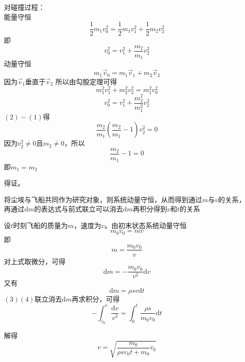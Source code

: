 \documentclass[b5paper,opensource,sourcefont,parskip]{qyxf-book}
\newcommand{\di}[1]{\mathrm{d}#1}
\begin{document}
对碰撞过程：\\能量守恒
\begin{equation*}
\frac{1}{2}m_1v_0^2=\frac{1}{2}m_1v_1^2+\frac{1}{2}m_2v_2^2
\end{equation*}
即
\begin{equation}
v_0^2=v_1^2+\frac{m_2}{m_1}v_2^2
\end{equation}
动量守恒
\begin{equation*}
m_1\vec{v}_0=m_1\vec{v}_1+m_2\vec{v}_2
\end{equation*}
因为$\vec{v}_1$垂直于$\vec{v}_2$
所以由勾股定理可得
\begin{equation*}
m_1^2 v_1^2 + m_2^2 v_2^2 = m_1^2 v_0^2
\end{equation*}
\begin{equation}
v_0^2=v_1^2+\frac{m_2^2}{m_1^2}v_2^2
\end{equation}
$(2)-(1)$得
\begin{equation*}
\frac{m_2}{m_1}(\frac{m_2}{m_1}-1)v_2^2=0
\end{equation*}
因为$v_2^2 \ne 0$且$m_2 \ne 0$，所以
\begin{equation*}
\frac{m_2}{m_1}-1=0
\end{equation*}
即$m_1=m_2$

得证。


\analysis 将尘埃与飞船共同作为研究对象，则系统动量守恒，从而得到通过$m$与$v$的关系，再通过$\di m$的表达式与前式联立可以消去$\di m$再积分得到$v$和$t$的关系
			
\solve 设$t$时刻飞船的质量为$m$，速度为$v$。由初末状态系统动量守恒
\begin{equation*}
m_0 v_0=mv
\end{equation*}
即
\begin{equation*}
m=\frac{m_0 v_0}{v}
\end{equation*}
对上式取微分，可得
\begin{equation}
\di m=- \frac{m_0 v_0}{v^2} \di v
\end{equation}
又有
\begin{equation}
\di m=\rho sv\di t
\end{equation}
$(3)(4)$联立消去$\di m$再求积分，可得
\begin{equation*}
-\int_{v_0}^v \frac{\di v}{v^3}=\int_0^t \frac{\rho s}{m_0 v_0} \di t
\end{equation*}

解得
\begin{equation*}
v=\sqrt{\frac{m_0}{\rho sv_0 t+m_0}v_0}
\end{equation*}
\end{document}
